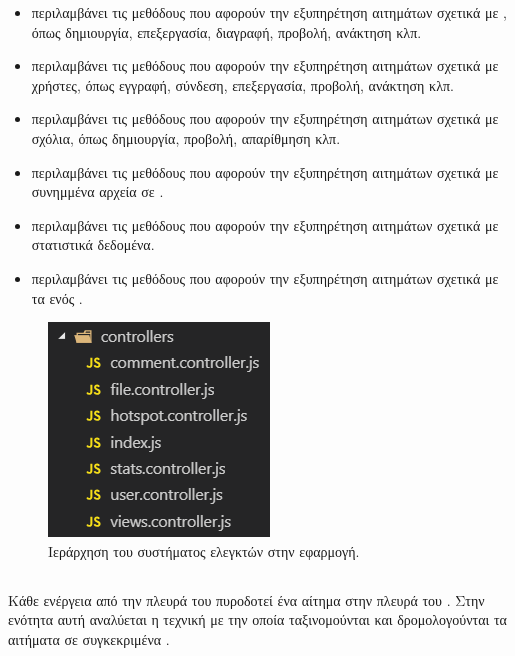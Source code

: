 \begin{itemize}
    \item {} περιλαμβάνει τις μεθόδους που αφορούν την εξυπηρέτηση αιτημάτων σχετικά με , όπως δημιουργία, επεξεργασία, διαγραφή, προβολή, ανάκτηση κλπ.
    \item {} περιλαμβάνει τις μεθόδους που αφορούν την εξυπηρέτηση αιτημάτων σχετικά με χρήστες, όπως εγγραφή, σύνδεση, επεξεργασία, προβολή, ανάκτηση κλπ.
    \item {} περιλαμβάνει τις μεθόδους που αφορούν την εξυπηρέτηση αιτημάτων σχετικά με σχόλια, όπως δημιουργία, προβολή, απαρίθμηση κλπ.
    \item {} περιλαμβάνει τις μεθόδους που αφορούν την εξυπηρέτηση αιτημάτων σχετικά με συνημμένα αρχεία σε .
    \item {} περιλαμβάνει τις μεθόδους που αφορούν την εξυπηρέτηση αιτημάτων σχετικά με στατιστικά δεδομένα.
    \item {} περιλαμβάνει τις μεθόδους που αφορούν την εξυπηρέτηση αιτημάτων σχετικά με τα  ενός .
\end{itemize}

\begin{figure}[h]
    \centering
    \includegraphics[scale=1]{figures/controllers-path-vscode.png}
    \caption{Ιεράρχηση του συστήματος ελεγκτών στην εφαρμογή.}
    \label{controllers}
\end{figure}

\subsection{}
Κάθε ενέργεια από την πλευρά του  πυροδοτεί ένα αίτημα στην πλευρά του . Στην ενότητα αυτή αναλύεται η τεχνική με την οποία ταξινομούνται και δρομολογούνται τα αιτήματα σε συγκεκριμένα .


